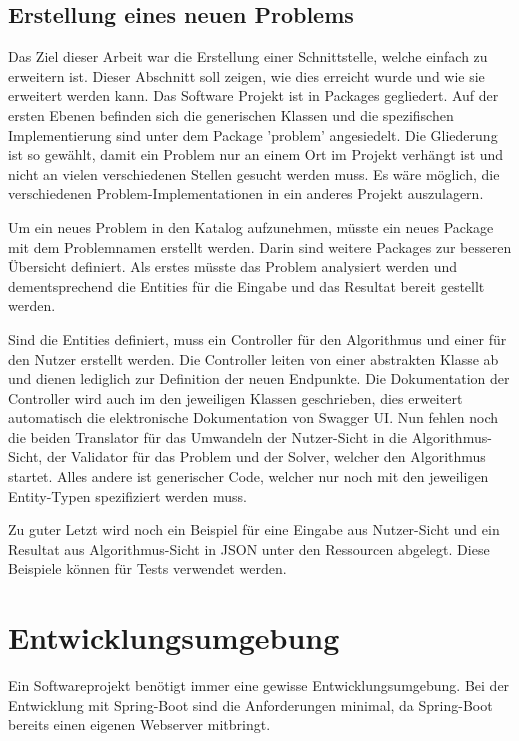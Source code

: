 \FloatBarrier

\subsection{Erstellung eines neuen Problems}
Das Ziel dieser Arbeit war die Erstellung einer Schnittstelle, welche einfach zu erweitern ist. Dieser Abschnitt soll zeigen, wie dies erreicht wurde und wie sie erweitert werden kann. Das 
Software Projekt ist in Packages gegliedert. Auf der ersten Ebenen befinden sich die generischen Klassen und die spezifischen Implementierung sind unter dem Package 'problem'  angesiedelt. 
Die Gliederung ist so gewählt, damit ein Problem nur an einem Ort im Projekt verhängt ist und nicht an vielen verschiedenen Stellen gesucht werden muss. Es wäre möglich, 
die verschiedenen Problem-Implementationen in ein anderes Projekt auszulagern.

Um ein neues Problem in den Katalog aufzunehmen, 
müsste ein neues Package mit dem Problemnamen erstellt werden. Darin sind weitere Packages zur besseren Übersicht definiert. Als erstes müsste das Problem analysiert werden und 
dementsprechend die Entities für die Eingabe und das Resultat bereit gestellt werden.

Sind die Entities definiert, muss ein Controller für den Algorithmus und einer für den Nutzer erstellt werden. Die Controller leiten von einer abstrakten Klasse ab und dienen lediglich zur Definition
der neuen Endpunkte. Die Dokumentation der Controller wird auch im den jeweiligen Klassen geschrieben, dies erweitert automatisch die elektronische Dokumentation von Swagger UI. 
Nun fehlen noch die beiden Translator für das Umwandeln der Nutzer-Sicht in die Algorithmus-Sicht, der Validator für das Problem und der Solver, welcher den Algorithmus 
startet. Alles andere ist generischer Code, welcher nur noch mit den jeweiligen Entity-Typen spezifiziert werden muss.

Zu guter Letzt wird noch ein Beispiel für eine Eingabe aus Nutzer-Sicht und ein Resultat aus Algorithmus-Sicht in JSON unter den Ressourcen abgelegt. Diese Beispiele können für Tests 
verwendet werden.

\newpage

\section{Entwicklungsumgebung}\label{entwicklungsumgebung}
Ein Softwareprojekt benötigt immer eine gewisse Entwicklungsumgebung. Bei der Entwicklung mit Spring-Boot sind die Anforderungen minimal, da Spring-Boot bereits einen eigenen Webserver 
mitbringt.

